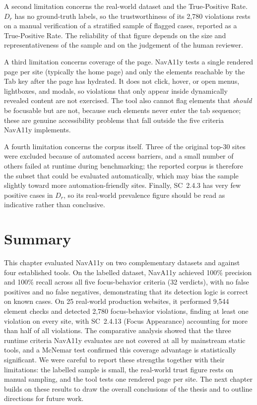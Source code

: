 A second limitation concerns the real-world dataset and the True-Positive Rate. $D_r$ has no
ground-truth labels, so the trustworthiness of its 2{,}780 violations rests on a manual
verification of a stratified sample of flagged cases, reported as a True-Positive Rate. The
reliability of that figure depends on the size and representativeness of the sample and on
the judgement of the human reviewer.

A third limitation concerns coverage of the page. NavA11y tests a single rendered page per
site (typically the home page) and only the elements reachable by the Tab key after the page
has hydrated. It does not click, hover, or open menus, lightboxes, and modals, so violations
that only appear inside dynamically revealed content are not exercised. The tool also cannot
flag elements that \emph{should} be focusable but are not, because such elements never enter
the tab sequence; these are genuine accessibility problems that fall outside the five
criteria NavA11y implements.

A fourth limitation concerns the corpus itself. Three of the original top-30 sites were
excluded because of automated access barriers, and a small number of others failed at
runtime during benchmarking; the reported corpus is therefore the subset that could be
evaluated automatically, which may bias the sample slightly toward more automation-friendly
sites. Finally, SC~2.4.3 has very few positive cases in $D_r$, so its real-world prevalence
figure should be read as indicative rather than conclusive.

\section{Summary}
\label{sec:res-summary}

This chapter evaluated NavA11y on two complementary datasets and against four established
tools. On the labelled dataset, NavA11y achieved 100\% precision and 100\% recall across all
five focus-behavior criteria (32 verdicts), with no false positives and no false
negatives, demonstrating that its detection logic is correct on known cases. On 25
real-world production websites, it performed 9{,}544 element checks and detected 2{,}780
focus-behavior violations, finding at least one violation on every site, with SC~2.4.13
(Focus Appearance) accounting for more than half of all violations. The comparative analysis
showed that the three runtime criteria NavA11y evaluates are not covered at all by
mainstream static tools, and a McNemar test confirmed this coverage advantage is
statistically significant. We were careful to report these strengths together with their
limitations: the labelled sample is small, the real-world trust figure rests on manual
sampling, and the tool tests one rendered page per site. The next chapter builds on these
results to draw the overall conclusions of the thesis and to outline directions for future
work.
